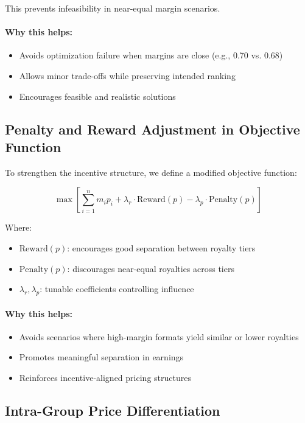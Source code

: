 This prevents infeasibility in near-equal margin scenarios.

\paragraph{Why this helps:}
\begin{itemize}
    \item Avoids optimization failure when margins are close (e.g., 0.70 vs. 0.68)
    \item Allows minor trade-offs while preserving intended ranking
    \item Encourages feasible and realistic solutions
\end{itemize}

\subsection{Penalty and Reward Adjustment in Objective Function}

To strengthen the incentive structure, we define a modified objective function:

\[
\max \left[ \sum_{i=1}^n m_i p_i + \lambda_r \cdot \text{Reward}(p) - \lambda_p \cdot \text{Penalty}(p) \right]
\]

Where:
\begin{itemize}
    \item \( \text{Reward}(p) \): encourages good separation between royalty tiers
    \item \( \text{Penalty}(p) \): discourages near-equal royalties across tiers
    \item \( \lambda_r, \lambda_p \): tunable coefficients controlling influence
\end{itemize}

\paragraph{Why this helps:}
\begin{itemize}
    \item Avoids scenarios where high-margin formats yield similar or lower royalties
    \item Promotes meaningful separation in earnings
    \item Reinforces incentive-aligned pricing structures
\end{itemize}

\subsection{Intra-Group Price Differentiation}

